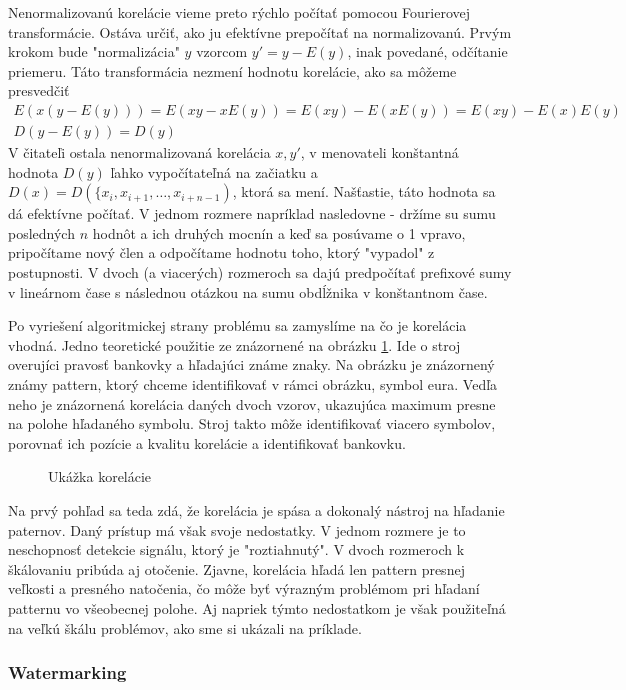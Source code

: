 Nenormalizovanú korelácie vieme preto rýchlo počítať pomocou
Fourierovej transformácie. Ostáva určiť, ako ju efektívne prepočítať
na normalizovanú.
Prvým krokom bude "normalizácia" $y$ vzorcom $y' = y-E(y)$, inak povedané,
odčítanie priemeru. Táto transformácia nezmení hodnotu korelácie, ako
sa môžeme presvedčiť
\begin{align}
    E(x (y-E(y))) = E(x y - x E(y)) = E(xy) - E(x E(y)) = E(xy) -
    E(x)E(y) \\
    D(y - E(y)) = D(y)
\end{align}
V čitateľi ostala nenormalizovaná korelácia $x,y'$, v menovateli
konštantná hodnota $D(y)$ ľahko vypočítateľná na začiatku a $D(x)=
D(\{x_i,x_{i+1},\dots,x_{i+n-1})$,
ktorá sa mení. Našťastie, táto hodnota sa dá efektívne počítať. V
jednom rozmere napríklad nasledovne - držíme su sumu posledných $n$
hodnôt a ich druhých mocnín a keď sa posúvame o 1 vpravo, pripočítame
nový člen a odpočítame hodnotu toho, ktorý "vypadol" z postupnosti. V
dvoch (a viacerých) rozmeroch sa dajú predpočítať prefixové sumy v
lineárnom čase s následnou otázkou na sumu obdĺžnika v konštantnom
čase.

Po vyriešení algoritmickej strany problému sa zamyslíme na čo je
korelácia vhodná. Jedno teoretické použitie ze znázornené na obrázku
\ref{fig:korelacia}. Ide o stroj overujíci pravosť bankovky a
hľadajúci známe znaky. Na obrázku je znázornený známy pattern, ktorý
chceme identifikovať v rámci obrázku, symbol eura. Vedľa neho je
znázornená korelácia daných dvoch vzorov, ukazujúca maximum presne na
polohe hľadaného symbolu. Stroj takto môže identifikovať viacero
symbolov, porovnať ich pozície a kvalitu korelácie a identifikovať
bankovku.
\begin{figure}[htp]
    \caption{Ukážka korelácie}
    \label{fig:korelacia}
\end{figure}

Na prvý pohľad sa teda zdá, že korelácia je spása a dokonalý nástroj
na hľadanie paternov. Daný prístup má však svoje nedostatky. V jednom
rozmere je to neschopnosť detekcie signálu, ktorý je "roztiahnutý". V
dvoch rozmeroch k škálovaniu pribúda aj otočenie. Zjavne, korelácia hľadá len
pattern presnej veľkosti a presného natočenia, čo môže byť výrazným
problémom pri hľadaní patternu vo všeobecnej polohe. Aj napriek týmto
nedostatkom je však použiteľná na veľkú škálu problémov, ako sme si
ukázali na príklade.


\subsubsection{Watermarking}
